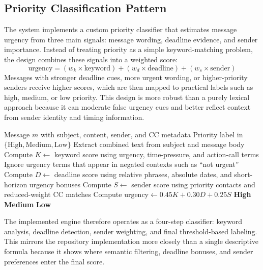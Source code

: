 \subsection{Priority Classification Pattern}
The system implements a custom priority classifier that estimates message urgency from three main signals: message wording, deadline evidence, and sender importance. Instead of treating priority as a simple keyword-matching problem, the design combines these signals into a weighted score:
\[
\text{urgency} = (w_k \times \text{keyword}) + (w_d \times \text{deadline}) + (w_s \times \text{sender})
\]
Messages with stronger deadline cues, more urgent wording, or higher-priority senders receive higher scores, which are then mapped to practical labels such as high, medium, or low priority. This design is more robust than a purely lexical approach because it can moderate false urgency cues and better reflect context from sender identity and timing information.

\begin{algorithm}[H]
\caption{Priority Classification in AutoReturn}
\label{alg:priority_classification}
\begin{algorithmic}[1]
\Require Message $m$ with subject, content, sender, and CC metadata
\Ensure Priority label in $\{\text{High}, \text{Medium}, \text{Low}\}$
\State Extract combined text from subject and message body
\State Compute $K \gets$ keyword score using urgency, time-pressure, and action-call terms
    \State Ignore urgency terms that appear in negated contexts such as ``not urgent''
\EndIf
\State Compute $D \gets$ deadline score using relative phrases, absolute dates, and short-horizon urgency bonuses
\State Compute $S \gets$ sender score using priority contacts and reduced-weight CC matches
\State Compute $\text{urgency} \gets 0.45K + 0.30D + 0.25S$
    \State \Return \textbf{High}
    \State \Return \textbf{Medium}
\Else
    \State \Return \textbf{Low}
\EndIf
\end{algorithmic}
\end{algorithm}

The implemented engine therefore operates as a four-step classifier: keyword analysis, deadline detection, sender weighting, and final threshold-based labeling. This mirrors the repository implementation more closely than a single descriptive formula because it shows where semantic filtering, deadline bonuses, and sender preferences enter the final score.

